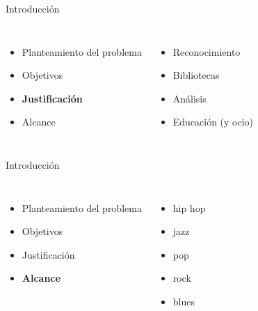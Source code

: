 \documentclass{beamer}
\newcommand{\currentsectionindex}{0}
\begin{document}
\begin{frame}{Introducción}
  \begin{columns}
  \column{5.5cm}
  \begin{itemize}
    \item Planteamiento del problema
    \item Objetivos
    \item \textbf{Justificación}
    \item Alcance
  \end{itemize}
  \column{6cm}
  \begin{itemize}
    \item Reconocimiento
    \item Bibliotecas
    \item Análisis
    \item Educación (y ocio)
  \end{itemize}
  \end{columns}
\end{frame}

\begin{frame}{Introducción}
\begin{columns}
\column{5.5cm}
\begin{itemize}
  \item Planteamiento del problema
  \item Objetivos
  \item Justificación
  \item \textbf{Alcance}
\end{itemize}
\column{6cm}
\begin{itemize}
  \item hip hop
  \item jazz
  \item pop
  \item rock
  \item blues
\end{itemize}
\end{columns}
\end{frame}

\renewcommand{\currentsectionindex}{2}
\end{document}
